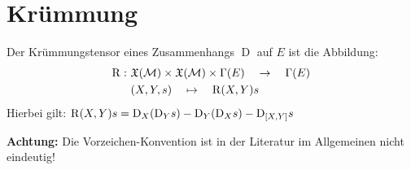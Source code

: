 \section{Krümmung}

\begin{defs}[Krümmungstensor]
Der Krümmungstensor eines Zusammenhangs $\operatorname{D}$ auf $E$ ist die Abbildung:
\begin{align*}
\operatorname{R}: \ & \mathfrak{X}(\mathcal{M}) \times \mathfrak{X}(\mathcal{M}) \times \Gamma(E) \quad \rightarrow \quad \Gamma(E) \\
&(X, Y, s) \quad \mapsto \quad \operatorname{R}(X,Y)s \\
\end{align*}
Hierbei gilt:  \quad $\operatorname{R}(X,Y)s = \mathrm{D}_X(\mathrm{D}_Ys) - \mathrm{D}_Y(\mathrm{D}_Xs) - \mathrm{D}_{[X,Y]}s$
\end{defs}

\textbf{Achtung:} Die Vorzeichen-Konvention ist in der Literatur im Allgemeinen nicht eindeutig!

